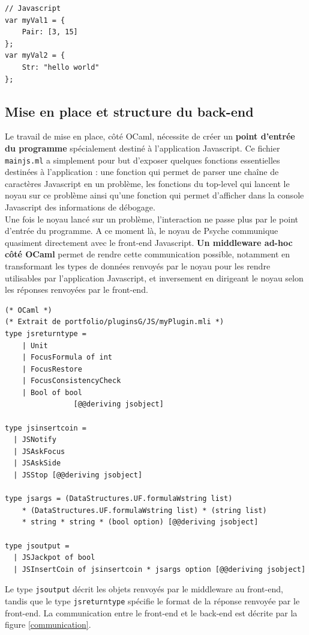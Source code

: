 \begin{verbatim}
// Javascript
var myVal1 = {
	Pair: [3, 15]
};
var myVal2 = {
	Str: "hello world"
};
\end{verbatim}

\subsection{Mise en place et structure du back-end}

Le travail de mise en place, côté OCaml, nécessite de créer un \textbf{point d'entrée du programme} spécialement destiné à l'application Javascript. Ce fichier \texttt{mainjs.ml} a simplement pour but d'exposer quelques fonctions essentielles destinées à l'application : une fonction qui permet de parser une chaîne de caractères Javascript en un problème, les fonctions du top-level qui lancent le noyau sur ce problème ainsi qu'une fonction qui permet d'afficher dans la console Javascript des informations de débogage.\\

Une fois le noyau lancé sur un problème, l'interaction ne passe plus par le point d'entrée du programme. A ce moment là, le noyau de Psyche communique quasiment directement avec le front-end Javascript. \textbf{Un middleware ad-hoc côté OCaml} permet de rendre cette communication possible, notamment en transformant les types de données renvoyés par le noyau pour les rendre utilisables par l'application Javascript, et inversement en dirigeant le noyau selon les réponses renvoyées par le front-end.

\begin{verbatim}
(* OCaml *)
(* Extrait de portfolio/pluginsG/JS/myPlugin.mli *)
type jsreturntype =
    | Unit
    | FocusFormula of int
    | FocusRestore
    | FocusConsistencyCheck
    | Bool of bool
                [@@deriving jsobject]

type jsinsertcoin =
  | JSNotify
  | JSAskFocus
  | JSAskSide
  | JSStop [@@deriving jsobject]

type jsargs = (DataStructures.UF.formulaWstring list)
    * (DataStructures.UF.formulaWstring list) * (string list)
    * string * string * (bool option) [@@deriving jsobject]

type jsoutput =
  | JSJackpot of bool
  | JSInsertCoin of jsinsertcoin * jsargs option [@@deriving jsobject]
\end{verbatim}

Le type \texttt{jsoutput} décrit les objets renvoyés par le middleware au front-end, tandis que le type \texttt{jsreturntype} spécifie le format de la réponse renvoyée par le front-end. La communication entre le front-end et le back-end est décrite par la figure \ref{communication}.

